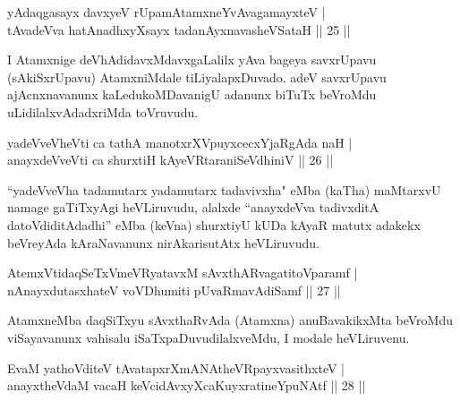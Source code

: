 
\begin{shl}
yAdaqgasayx davxyeV rUpamAtamxneYvAvagamayxteV  | \\
tAvadeVva hatAnadhxyXsayx tadanAyxnavasheVSataH \hfill||  25 ||  
\end{shl}

\begin{artha}
I Atamxnige deVhAdidavxMdavxgaLalilx yAva bageya savxrUpavu (sAkiSxrUpavu) AtamxniMdale tiLiyalapxDuvado. adeV savxrUpavu ajAcnxnavanunx kaLedukoMDavanigU adanunx biTuTx beVroMdu uLidilalxvAdadxriMda toVruvudu.
\end{artha}


\begin{shl}
yadeVveVheVti ca tathA manotxrXV\s puyxcecxYjaRgAda naH  | \\
anayxdeVveVti ca shurxtiH kAyeVRtaraniSeVdhiniV \hfill||  26 || 
\end{shl}

\begin{artha}
``yadeVveVha tadamutarx yadamutarx tadavivxha" eMba (kaTha) maMtarxvU namage gaTiTxyAgi heVLiruvudu, alalxde ``anayxdeVva tadivxditA datoV\s diditAdadhi'' eMba (keVna) shurxtiyU kUDa kAyaR matutx adakekx beVreyAda kAraNavanunx nirAkarisutAtx heVLiruvudu.
\end{artha}


\begin{shl}
AtemxVtidaqSeTxVmeVRyatavxM sAvxthARvagatitoV\s paramf  | \\
nAnayxdutasxhateV voVDhumiti pUvaRmavAdiSamf \hfill||  27 ||  
\end{shl}

\begin{artha}
AtamxneMba daqSiTxyu sAvxthaRvAda (Atamxna) anuBavakikxMta beVroMdu viSayavanunx vahisalu iSaTxpaDuvudilalxveMdu, I modale heVLiruvenu.
\end{artha}



\begin{shl}
EvaM yathoVditeV tAvatapxrXmANAtheVR\s payxvasithxteV  | \\
anayxtheVdaM vacaH keVcidAvxyXcaKuyxratineYpuNAtf \hfill||  28 ||  
\end{shl}

